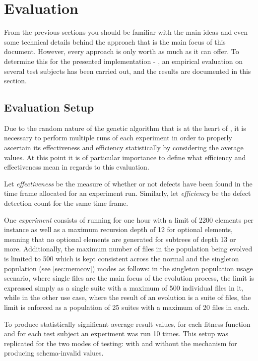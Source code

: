 \section{Evaluation}
\label{sec:evaluation}
From the previous sections you should be familiar with the main ideas and even some technical details behind
the approach that is the main focus of this document. However, every approach is only worth as much as it can
offer. To determine this for the presented implementation - \xmlmate, an empirical evaluation on several test
subjects has been carried out, and the results are documented in this section.
\subsection{Evaluation Setup}

Due to the random nature of the genetic algorithm that is at the heart of \xmlmate, it is necessary to perform
multiple runs of each experiment in order to properly ascertain its effectiveness and efficiency statistically
by considering the average values. At this point it is of particular importance to define what efficiency and
effectiveness mean in regards to this evaluation. 

Let \emph{effectiveness} be the measure of whether or not defects have been found in the time frame allocated
for an experiment run. Similarly, let \emph{efficiency} be the defect detection count for the same time frame.

One \emph{experiment} consists of running \xmlmate for one hour with a limit of 2200 elements per \xml instance
as well as a maximum recursion depth of 12 for optional elements, meaning that no optional elements are generated
for subtrees of depth 13 or more. Additionally, the maximum number of \xml files in the population being
evolved is limited to 500 which is kept consistent across the normal and the singleton population (see
\cref{sec:memcov}) modes as follows: in the singleton population usage scenario, where single files are the
main focus of the evolution process, the limit is expressed simply as a single suite with a maximum of 500
individual files in it, while in the other use case, where the result of an evolution is a suite of files, the
limit is enforced as a population of 25 suites with a maximum of 20 files in each.

To produce statistically significant average result values, for each fitness function and for each test
subject an experiment was run 10 times. This setup was replicated for the two modes of testing: with and
without the mechanism for producing schema-invalid values.

